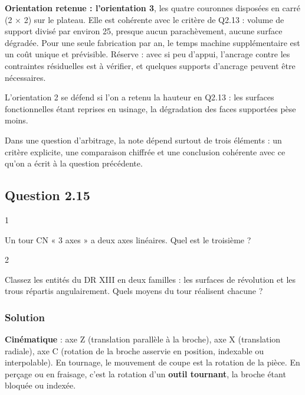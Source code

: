 \documentclass[11pt,a4paper]{article}
\begin{document}
\textbf{Orientation retenue : l'orientation 3}, les quatre couronnes disposées en carré (2 × 2) sur le plateau. Elle est cohérente avec le critère de Q2.13 : volume de support divisé par environ 25, presque aucun parachèvement, aucune surface dégradée. Pour une seule fabrication par an, le temps machine supplémentaire est un coût unique et prévisible. Réserve : avec si peu d'appui, l'ancrage contre les contraintes résiduelles est à vérifier, et quelques supports d'ancrage peuvent être nécessaires.

L'orientation 2 se défend si l'on a retenu la hauteur en Q2.13 : les surfaces fonctionnelles étant reprises en usinage, la dégradation des faces supportées pèse moins.

\begin{jury}

Dans une question d'arbitrage, la note dépend surtout de trois éléments : un critère explicite, une comparaison chiffrée et une conclusion cohérente avec ce qu'on a écrit à la question précédente.

\end{jury}

\hypertarget{question-2.15}{%
\subsection{Question 2.15}\label{question-2.15}}

\begin{indication}{1}

Un tour CN « 3 axes » a deux axes linéaires. Quel est le troisième ?

\end{indication}

\begin{indication}{2}

Classez les entités du DR XIII en deux familles : les surfaces de révolution et les trous répartis angulairement. Quels moyens du tour réalisent chacune ?

\end{indication}

\hypertarget{solution-28}{%
\subsubsection{Solution}\label{solution-28}}

\textbf{Cinématique} : axe Z (translation parallèle à la broche), axe X (translation radiale), axe C (rotation de la broche asservie en position, indexable ou interpolable). En tournage, le mouvement de coupe est la rotation de la pièce. En perçage ou en fraisage, c'est la rotation d'un \textbf{outil tournant}, la broche étant bloquée ou indexée.
\end{document}
